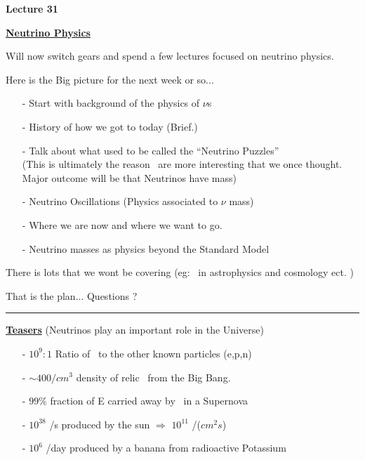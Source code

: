 \usepackage{fancyhdr}

\fancyhf{}


\thispagestyle{fancy}

\begin{center}
{\huge \textbf{Lecture 31}}
\end{center}

{\fontsize{14}{16}\selectfont

\textbf{\underline{Neutrino Physics}} 

Will now switch gears and spend a few lectures focused on neutrino physics. 

Here is the Big picture for the next week or so...

\begin{itemize}
\item[-] Start with background of the physics of $\nu$s
\item[-] History of how we got to today (Brief.)
\item[-] Talk about what used to be called the ``Neutrino Puzzles''\\
          (This is ultimately the reason \nus\ are more interesting that we once thought. Major outcome will be that Neutrinos have mass)
\item[-] Neutrino Oscillations (Physics associated to $\nu$ mass)
\item[-] Where we are now and where we want to go.
\item[-] Neutrino masses as physics beyond the Standard Model\\
\end{itemize}

There is lots that we wont be covering (eg: \nus\ in astrophysics and cosmology ect. )

\vspace*{0.4in}

That is the plan... Questions ?

\vspace*{0.2in}

\noindent\rule{\textwidth}{1pt}

\textbf{\underline{Teasers}} (Neutrinos play an important role in the Universe)

\begin{itemize}
\item[-] $10^9:1$ Ratio of \nus\ to the other known particles (e,p,n)
\item[-] $\sim400/cm^3$ density of relic \nus\ from the Big Bang.
\item[-] $99\%$ fraction of E carried away by \nus\ in a Supernova
\item[-] $10^{38}$ \nus/s produced by the sun $\Rightarrow$ $10^{11}$ \nus/($cm^2s$)
\item[-] $10^6$ \nus/day produced by a banana from radioactive Potassium
\end{itemize}

}
